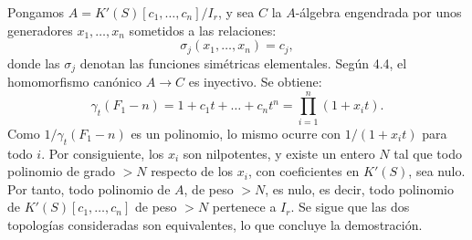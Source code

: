 Pongamos \(A=K'(S)[c_1,\ldots,c_n]/I_r\), y sea \(C\) la \(A\)-álgebra engendrada por unos generadores \(x_1,\ldots,x_n\) sometidos a las relaciones:
\[
  \sigma_j(x_1,\ldots,x_n)=c_j,
\]
donde las \(\sigma_j\) denotan las funciones simétricas elementales. Según 4.4, el homomorfismo canónico \(A\to C\) es inyectivo. Se obtiene:
\[
  \gamma_t(F_1-n)
  =1+c_1t+\ldots+c_nt^n
  =\prod_{i=1}^n(1+x_it).
\]
Como \(1/\gamma_t(F_1-n)\) es un polinomio, lo mismo ocurre con \(1/(1+x_it)\) para todo \(i\). Por consiguiente, los \(x_i\) son nilpotentes, y existe un entero \(N\) tal que todo polinomio de grado \(>N\) respecto de los \(x_i\), con coeficientes en \(K'(S)\), sea nulo. Por tanto, todo polinomio de \(A\), de peso \(>N\), es nulo, es decir, todo polinomio de \(K'(S)[c_1,\ldots,c_n]\) de peso \(>N\) pertenece a \(I_r\). Se sigue que las dos topologías consideradas son equivalentes, lo que concluye la demostración.


